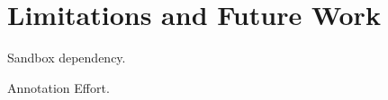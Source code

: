 \section{Limitations and Future Work}
\label{sec:limitations}
Sandbox dependency.

Annotation Effort.
